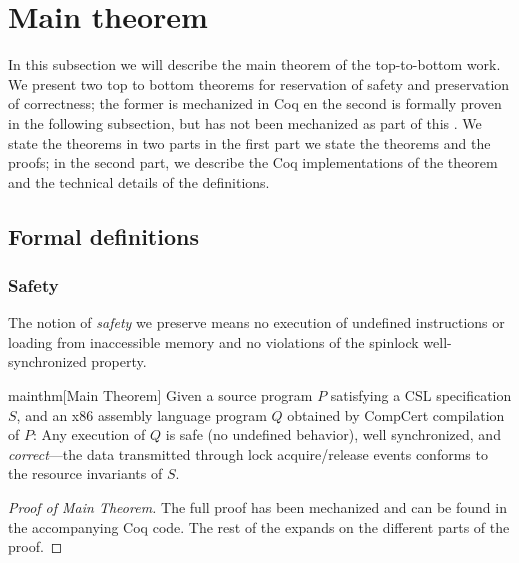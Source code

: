 \section{Main theorem}
\label{sec:topbottom:theorem}


In this subsection we will describe the main theorem of the top-to-bottom work. We present two top to bottom theorems for reservation of safety and preservation of correctness; the former is mechanized in Coq en the second is formally proven in the following subsection, but has not been mechanized as part of this . We state the theorems in two parts in the first part we state the theorems and the proofs; in the second part, we describe the Coq implementations of the theorem and the technical details of the definitions. 

\subsection{Formal definitions}\label{sec:topbottomdefs}

\subsubsection{Safety}

The notion of \emph{safety} we preserve means no execution of undefined instructions or loading from inaccessible memory and no violations of the spinlock well-synchronized property.

\begin{reptheorem}{mainthm}[Main Theorem]\hypertarget{mainthm-formal}{
Given a source program $P$ satisfying a CSL specification $S$, and an
x86 assembly language program $Q$ obtained by CompCert compilation of
$P$: Any execution of $Q$ is safe (no undefined behavior), well
synchronized, and \emph{correct}---the data transmitted through lock
acquire/release events conforms to the resource invariants of $S$.}
\end{reptheorem}

\begin{proof}[Proof of Main Theorem] The full proof has been mechanized and can be found in the accompanying Coq code. The rest of the  expands on the different parts of the proof.
\end{proof}

